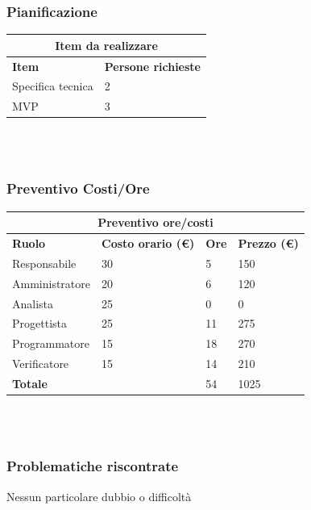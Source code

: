 \documentclass[9pt]{article}
\begin{document}
\subsubsection{Pianificazione}
\begin{center}
	\begin{tabularx}{\textwidth}{|X|X|}
		\hline
		\multicolumn{2}{|c|}{\textbf{Item da realizzare}}     \\
		\hline
		\hline
		\textbf{Item}            & \textbf{Persone richieste} \\
		\hline
		Specifica tecnica        	& 2                          \\
		\hline
		MVP        					& 3           \\
		\hline
	\end{tabularx}\\[8pt]
	\mbox{}\\
\end{center}
\subsubsection{Preventivo Costi/Ore}
\begin{center}
	\begin{tabularx}{\textwidth}{|X|X|X|X|}
		\hline
		\multicolumn{4}{|c|}{\textbf{Preventivo ore/costi}}                                      \\
		\hline
		\hline
		\textbf{Ruolo}  & \textbf{Costo orario (\euro)} & \textbf{Ore} & \textbf{Prezzo (\euro)} \\
		\hline									
		Responsabile    &	30		&	5		&	150		\\
		\hline									
		Amministratore  &	20		&	6		&	120		\\
		\hline									
		Analista        &	25		&	0		&	0		\\
		\hline									
		Progettista     &	25		&	11		&	275		\\
		\hline									
		Programmatore   &	15		&	18		&	270		\\
		\hline									
		Verificatore    &	15		&	14		&	210		\\
		\hline									
		\textbf{Totale} &			&	54		&	1025		\\
		\hline																																	
	\end{tabularx}\\[8pt]
	\mbox{}\\
\end{center}
\subsubsection{Problematiche riscontrate}
Nessun particolare dubbio o difficoltà
\end{document}
